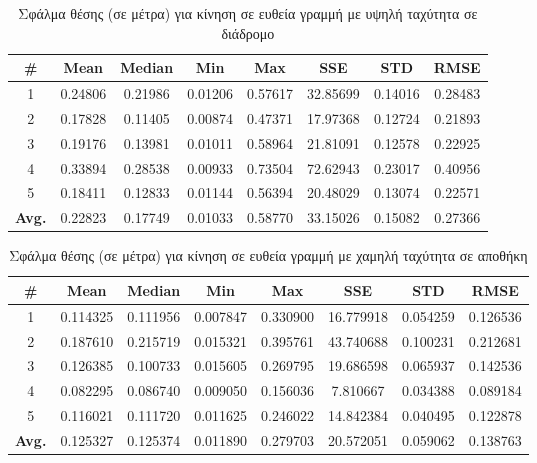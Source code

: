 \begin{table}[H]
    \begin{center}
        \centering
        \caption{Σφάλμα θέσης (σε μέτρα) για κίνηση σε ευθεία γραμμή με υψηλή ταχύτητα σε διάδρομο}
        \label{tab:position_error_line_fast_corridor}
        \begin{tabular}{| c | c | c | c | c | c | c | c | }
        \hline
        \rowcolor{Gray}
        \# & Mean & Median & Min & Max & SSE & STD & RMSE \\
        \hline
        1 & 0.24806 & 0.21986 & 0.01206 & 0.57617 & 32.85699 & 0.14016 & 0.28483 \\
        2 & 0.17828 & 0.11405 & 0.00874 & 0.47371 & 17.97368 & 0.12724 & 0.21893 \\ 
        3 & 0.19176 & 0.13981 & 0.01011 & 0.58964 & 21.81091 & 0.12578 & 0.22925 \\
        4 & 0.33894 & 0.28538 & 0.00933 & 0.73504 & 72.62943 & 0.23017 & 0.40956 \\
        5 & 0.18411 & 0.12833 & 0.01144 & 0.56394 & 20.48029 & 0.13074 & 0.22571 \\
        \hline
        \textbf{Avg.} & 0.22823 & 0.17749 & 0.01033 & 0.58770 & 33.15026 & 0.15082 & 0.27366 \\
        \hline
        \end{tabular}
    \end{center}
\end{table}

\begin{table}[H]
    \begin{center}
        \centering
        \caption{Σφάλμα θέσης (σε μέτρα) για κίνηση σε ευθεία γραμμή με χαμηλή ταχύτητα σε αποθήκη}
        \label{tab:position_error_line_slow_warehouse}
        \begin{tabular}{| c | c | c | c | c | c | c | c | }
        \hline
        \rowcolor{Gray}
        \# & Mean & Median & Min & Max & SSE & STD & RMSE \\
        \hline
        1 & 0.114325 & 0.111956 & 0.007847 & 0.330900 & 16.779918 & 0.054259 & 0.126536 \\ 
        2 & 0.187610 & 0.215719 & 0.015321 & 0.395761 & 43.740688 & 0.100231 & 0.212681 \\
        3 & 0.126385 & 0.100733 & 0.015605 & 0.269795 & 19.686598 & 0.065937 & 0.142536 \\ 
        4 & 0.082295 & 0.086740 & 0.009050 & 0.156036 & 7.810667 & 0.034388 & 0.089184 \\ 
        5 & 0.116021 & 0.111720 & 0.011625 & 0.246022 & 14.842384 & 0.040495 & 0.122878 \\
        \hline
        \textbf{Avg.} & 0.125327 & 0.125374 & 0.011890 & 0.279703 & 20.572051 & 0.059062 & 0.138763 \\
        \hline
        \end{tabular}
    \end{center}
\end{table}

